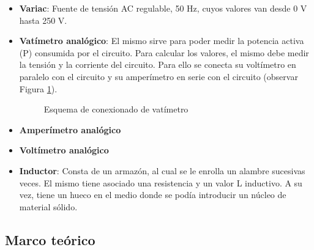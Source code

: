 \documentclass{article}
\begin{document}
        \begin{itemize}
            \renewcommand{\labelitemi}{$\bullet$}
            \item {\bfseries Variac}: Fuente de tensión AC regulable, 50 Hz, cuyos valores van desde 0 V hasta 250 V.
            \item {\bfseries Vatímetro analógico}: El mismo sirve para poder medir la potencia activa (P) consumida por el circuito.
                    Para calcular los valores, el mismo debe medir la tensión y la corriente del circuito.
                     Para ello se conecta su voltímetro en paralelo con el circuito y su amperímetro en serie 
                     con el circuito (observar Figura \ref{fig:vatimetro}). \par

                    \begin{figure}[h!] %
                        \centering
                        \caption{Esquema de conexionado de vatímetro}
                        \label{fig:vatimetro}
                    \end{figure}
            \item {\bfseries Amperímetro analógico}
            \item {\bfseries Voltímetro analógico}
            \item {\bfseries Inductor}: Consta de un armazón, al cual se le enrolla un
             alambre sucesivas veces. El mismo tiene asociado una resistencia y un valor L inductivo. 
                A su vez, tiene un hueco en el medio donde se podía introducir un núcleo de material sólido. 
        \end{itemize}
        
        \subsection{Marco teórico}
\end{document}
